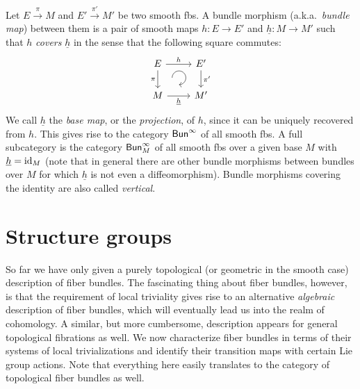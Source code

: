 \begin{defn}
    Let $E\overset{\pi}{\to}M$ and $E'\overset{\pi'}{\to}M'$ be two smooth \glspl{fb}. A bundle morphism (a.k.a.\ \emph{bundle map}) between them is a pair of smooth maps $h:E\to E'$ and $\underline{h}:M\to M'$ such that $h$ \emph{covers} $\underline{h}$ in the sense that the following square commutes:
    \[\begin{tikzcd}[every matrix/.append style={name=m},   
    execute at end picture={\draw [<-] ([xshift=-8mm,yshift=1mm]m-2-2.north) arc[start angle=-90,delta angle=270,radius=0.25cm];}]
       E \arrow[r,"h"]\arrow[d,swap,"\pi"]& E'\arrow[d,"\pi'"] \\
       M\arrow[r,swap,"\underline{h}"]& M'
    \end{tikzcd}\]
    We call $\underline{h}$ the \emph{base map}, or the \emph{projection}, of $h$, since it can be uniquely recovered from $h$.
    This gives rise to the category $\mathsf{Bun}^\infty$ of all smooth \glspl{fb}. A full subcategory is the category $\mathsf{Bun}^\infty_M$ of all smooth \glspl{fb} over a given base $M$ with $\underline{h}=\operatorname{id}_M$ (note that in general there are other bundle morphisms between bundles over $M$ for which $\underline{h}$ is not even a diffeomorphism). Bundle morphisms covering the identity are also called \emph{vertical}.
\end{defn}








\section{Structure groups}\label{sec: structure groups}

So far we have only given a purely topological (or geometric in the smooth case) description of fiber bundles. The fascinating thing about fiber bundles, however, is that the requirement of local triviality gives rise to an alternative \emph{algebraic} description of fiber bundles, which will eventually lead us into the realm of cohomology. A similar, but more cumbersome, description appears for general topological fibrations as well. We now characterize fiber bundles in terms of their systems of local trivializations and identify their transition maps with certain Lie group actions. Note that everything here easily translates to the category of topological fiber bundles as well.


